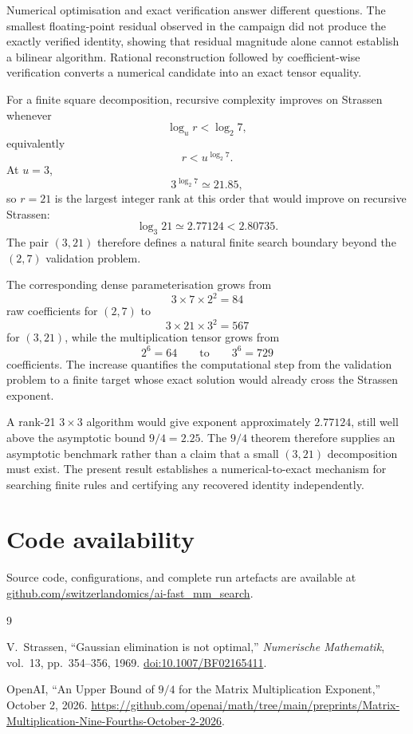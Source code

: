 \documentclass[12pt]{article}
\begin{document}
Numerical optimisation and exact verification answer different
questions. The smallest floating-point residual observed in the
campaign did not produce the exactly verified identity, showing that
residual magnitude alone cannot establish a bilinear algorithm.
Rational reconstruction followed by coefficient-wise verification
converts a numerical candidate into an exact tensor equality.

For a finite square decomposition, recursive complexity improves on
Strassen whenever
\[
\log_u r < \log_2 7,
\]
equivalently
\[
r < u^{\log_2 7}.
\]
At $u=3$,
\[
3^{\log_2 7} \simeq 21.85,
\]
so $r=21$ is the largest integer rank at this order that would improve
on recursive Strassen:
\[
\log_3 21 \simeq 2.77124 < 2.80735.
\]
The pair $(3,21)$ therefore defines a natural finite search boundary
beyond the $(2,7)$ validation problem.

The corresponding dense parameterisation grows from
\[
3\times7\times2^2 = 84
\]
raw coefficients for $(2,7)$ to
\[
3\times21\times3^2 = 567
\]
for $(3,21)$, while the multiplication tensor grows from
\[
2^6=64
\qquad\text{to}\qquad
3^6=729
\]
coefficients. The increase quantifies the computational step from the
validation problem to a finite target whose exact solution would
already cross the Strassen exponent.

A rank-21 $3\times3$ algorithm would give exponent approximately
$2.77124$, still well above the asymptotic bound $9/4=2.25$. The
$9/4$ theorem therefore supplies an asymptotic benchmark rather than
a claim that a small $(3,21)$ decomposition must exist. The present
result establishes a numerical-to-exact mechanism for searching
finite rules and certifying any recovered identity independently.

\section*{Code availability}

Source code, configurations, and complete run artefacts are available at \\
\href{https://github.com/switzerlandomics/ai-fast_mm_search}
{github.com/switzerlandomics/ai-fast\_mm\_search}.

\begin{thebibliography}{9}

V.~Strassen,
``Gaussian elimination is not optimal,''
\emph{Numerische Mathematik},
vol.~13, pp.~354--356, 1969.
\href{https://doi.org/10.1007/BF02165411}
{doi:10.1007/BF02165411}.

OpenAI,
``An Upper Bound of $9/4$ for the Matrix Multiplication Exponent,''
October 2, 2026.
\url{https://github.com/openai/math/tree/main/preprints/Matrix-Multiplication-Nine-Fourths-October-2-2026}.

\end{thebibliography}
\end{document}
